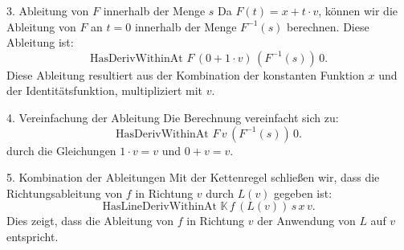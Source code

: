 \documentclass{beamer}
\begin{document}
    \begin{frame}
        \begin{block}{3. Ableitung von \( F \) innerhalb der Menge \( s \)}
            Da \( F(t) = x + t \cdot v \), können wir die Ableitung von \( F \) an \( t = 0 \) innerhalb der Menge \( F^{-1}(s) \) berechnen. Diese Ableitung ist:
            \[
            \text{HasDerivWithinAt } F \, (0 + 1 \cdot v) \, (F^{-1}(s)) \, 0.
            \]
            Diese Ableitung resultiert aus der Kombination der konstanten Funktion \( x \) und der Identitätsfunktion, multipliziert mit \( v \).
        \end{block}
    
        \begin{block}{4. Vereinfachung der Ableitung}
            Die Berechnung vereinfacht sich zu:
            \[
            \text{HasDerivWithinAt } F \, v \, (F^{-1}(s)) \, 0.
            \]
            durch die Gleichungen \( 1 \cdot v = v \) und \( 0 + v = v \).
        \end{block}
    \end{frame}
    
    \begin{frame}
        \begin{block}{5. Kombination der Ableitungen}
            Mit der Kettenregel schließen wir, dass die Richtungsableitung von \( f \) in Richtung \( v \) durch \( L(v) \) gegeben ist:
            \[
            \text{HasLineDerivWithinAt } \mathbb{K} \, f \, (L(v)) \, s \, x \, v.
            \]
            Dies zeigt, dass die Ableitung von \( f \) in Richtung \( v \) der Anwendung von \( L \) auf \( v \) entspricht.
        \end{block}
    \end{frame}
\end{document}
